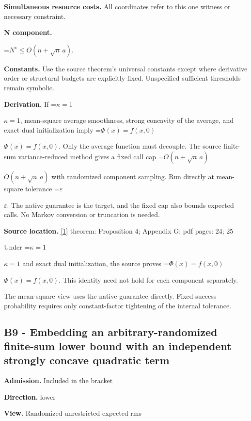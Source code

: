 \documentclass[10pt,a4paper]{article}
\newcommand{\AtlasMath}[1]{\par\begingroup\centering\setbox0=\hbox{$\displaystyle #1$}\ifdim\wd0>1.4\linewidth\typeout{ATLAS WIDE FORMULA: \the\wd0}\fi\ifdim\wd0>\linewidth\resizebox{\linewidth}{!}{\box0}\else\box0\fi\par\endgroup}
\newcommand{\AtlasInlineMath}[1]{\begingroup\setbox0=\hbox{$#1$}\ifdim\wd0>.4\linewidth\endgroup\AtlasMath{#1}\else\endgroup$#1$\fi}
\begin{document}
\textbf{Simultaneous resource costs.} All coordinates refer to this one witness or necessary constraint.



\textbf{N component.}



\AtlasMath{N^\star\le O(n+\sqrt n\,a).}


\textbf{Constants.} Use the source theorem’s universal constants except where derivative order or structural budgets are explicitly fixed. Unspecified sufficient thresholds remain symbolic.



\textbf{Derivation.} If \AtlasInlineMath{\kappa=1}, mean-square average smoothness, strong concavity of the average, and exact dual initialization imply \AtlasInlineMath{\Phi(x)=f(x,0)}. Only the average function must decouple. The source finite-sum variance-reduced method gives a fixed call cap \AtlasInlineMath{O(n+\sqrt n\,a)} with randomized component sampling. Run directly at mean-square tolerance \AtlasInlineMath{\varepsilon}. The native guarantee is the target, and the fixed cap also bounds expected calls. No Markov conversion or truncation is needed.



\textbf{Source location.} \href{https://arxiv.org/pdf/2610.04944v1}{[1]} theorem: Proposition 4; Appendix G; pdf pages: 24; 25



Under \AtlasInlineMath{\kappa=1} and exact dual initialization, the source proves \AtlasInlineMath{\Phi(x)=f(x,0)}. This identity need not hold for each component separately.



The mean-square view uses the native guarantee directly. Fixed success probability requires only constant-factor tightening of the internal tolerance.



\subsection{B9 - Embedding an arbitrary-randomized finite-sum lower bound with an independent strongly concave quadratic term}


\textbf{Admission.} Included in the bracket



\textbf{Direction.} lower



\textbf{View.} Randomized unrestricted expected rms
\end{document}
